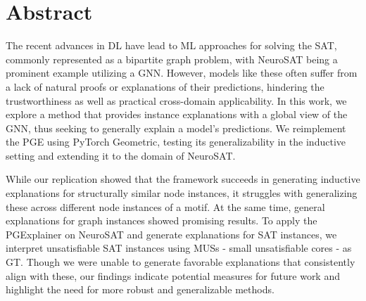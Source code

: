 \chapter*{Abstract}



The recent advances in \ac{DL} have lead to \ac{ML} approaches for solving the \ac{SAT}, commonly represented as a bipartite graph problem, with NeuroSAT being a prominent example utilizing a \ac{GNN}. However, models like these often suffer from a lack of natural proofs or explanations of their predictions, hindering the trustworthiness as well as practical cross-domain applicability. In this work, we explore a method that provides instance explanations with a global view of the GNN, thus seeking to generally explain a model's predictions. We reimplement the \ac{PGE} using PyTorch Geometric, testing its generalizability in the inductive setting and extending it to the domain of NeuroSAT.

While our replication showed that the framework succeeds in generating inductive explanations for structurally similar node instances, it struggles with generalizing these across different node instances of a motif. At the same time, general explanations for graph instances showed promising results. To apply the PGExplainer on NeuroSAT and generate explanations for SAT instances, we interpret unsatisfiable SAT instances using \acp{MUS} - small unsatisfiable cores - as \ac{GT}. Though we were unable to generate favorable explanations that consistently align with these, our findings indicate potential measures for future work and highlight the need for more robust and generalizable methods. 